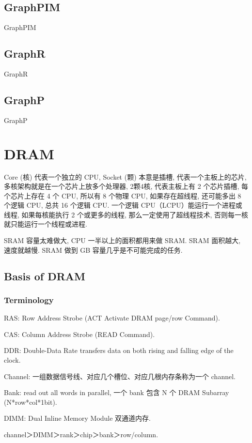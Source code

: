 \documentclass[UTF8,12pt,a4paper]{article}
\begin{document}
\subsection{GraphPIM}
GraphPIM~\cite{DBLP:conf/hpca/NaiHSKKK17}

\subsection{GraphR}
GraphR~\cite{DBLP:conf/hpca/SongZQLC18}

\subsection{GraphP}
GraphP~\cite{DBLP:conf/hpca/ZhangZWGWCKQ18}

\clearpage

\section{DRAM}
Core (核) 代表一个独立的 CPU, Socket (颗) 本意是插槽,
代表一个主板上的芯片, 多核架构就是在一个芯片上放多个处理器,
2颗4核, 代表主板上有 2 个芯片插槽, 每个芯片上存在 4 个 CPU, 所以有 8 个物理 CPU,
如果存在超线程, 还可能多出 8 个逻辑 CPU, 总共 16 个逻辑 CPU.
一个逻辑 CPU（LCPU）能运行一个进程或线程, 如果每核能执行 2 个或更多的线程,
那么一定使用了超线程技术, 否则每一核就只能运行一个线程或进程.

SRAM 容量太难做大, CPU 一半以上的面积都用来做 SRAM.
SRAM 面积越大, 速度就越慢.
SRAM 做到 GB 容量几乎是不可能完成的任务.

\subsection{Basis of DRAM}
\subsubsection{Terminology}
\begin{compactitem}
  \item RAS: Row Address Strobe (ACT Activate DRAM page/row Command).
  \item CAS: Column Address Strobe (READ Command).
  \item DDR: Double-Data Rate transfers data
  on both rising and falling edge of the clock.
  \item Channel: 一组数据信号线、对应几个槽位、对应几根内存条称为一个 channel.
  \item Bank: read out all words in parallel, 一个 bank 包含 N 个 DRAM Subarray (N*row*col*1bit).
  \item DIMM: Dual Inline Memory Module 双通道内存.
  \item channel＞DIMM＞rank＞chip＞bank＞row/column.
\end{compactitem}
\end{document}
